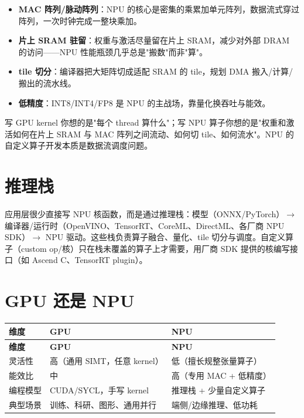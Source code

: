 \documentclass[12pt,a4paper,fontset=fandol]{ctexbook}
\begin{document}
\begin{itemize}[nosep]
  \item \textbf{MAC 阵列/脉动阵列}：NPU 的核心是密集的乘累加单元阵列，数据流式穿过阵列，一次时钟完成一整块乘加。
  \item \textbf{片上 SRAM 驻留}：权重与激活尽量留在片上 SRAM，减少对外部 DRAM 的访问——NPU 性能瓶颈几乎总是"搬数"而非"算"。
  \item \textbf{tile 切分}：编译器把大矩阵切成适配 SRAM 的 tile，规划 DMA 搬入/计算/搬出的流水线。
  \item \textbf{低精度}：INT8/INT4/FP8 是 NPU 的主战场，靠量化换吞吐与能效。
\end{itemize}

\begin{tcolorbox}[guideline={NPU 编程的重心是"数据流"而非"线程"}]
写 GPU kernel 你想的是"每个 thread 算什么"；写 NPU 算子你想的是"权重和激活如何在片上 SRAM 与 MAC 阵列之间流动、如何切 tile、如何流水"。NPU 的自定义算子开发本质是数据流调度问题。
\end{tcolorbox}

\section{推理栈}\label{sec:npu-stack}

应用层很少直接写 NPU 核函数，而是通过推理栈：模型（ONNX/PyTorch）$\rightarrow$ 编译器/运行时（OpenVINO、TensorRT、CoreML、DirectML、各厂商 NPU SDK）$\rightarrow$ NPU 驱动。这些栈负责算子融合、量化、tile 切分与调度。自定义算子（custom op/核）只在栈未覆盖的算子上才需要，用厂商 SDK 提供的核编写接口（如 Ascend C、TensorRT plugin）。

\section{GPU 还是 NPU}\label{sec:gpu-vs-npu}

\begin{longtable}{p{3.0cm}p{5.6cm}p{5.6cm}}
\toprule
\textbf{维度} & \textbf{GPU} & \textbf{NPU} \\
\midrule
\endfirsthead
\toprule
\textbf{维度} & \textbf{GPU} & \textbf{NPU} \\
\midrule
\endhead
灵活性   & 高（通用 SIMT，任意 kernel） & 低（擅长规整张量算子） \\
能效比   & 中                          & 高（专用 MAC + 低精度） \\
编程模型 & CUDA/SYCL，手写 kernel      & 推理栈 + 少量自定义算子 \\
典型场景 & 训练、科研、图形、通用并行  & 端侧/边缘推理、低功耗 \\
\bottomrule
\end{longtable}
\end{document}

